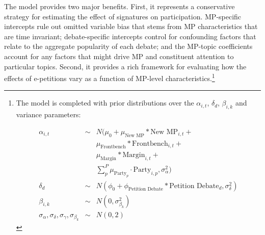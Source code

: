 \documentclass[12pt]{article}
\begin{document}
The model provides two major benefits. First, it represents a conservative strategy for estimating the effect of signatures on participation. MP-specific intercepts rule out omitted variable bias that stems from MP characteristics that are time invariant; debate-specific intercepts control for confounding factors that relate to the aggregate popularity of each debate; and the MP-topic coefficients account for any factors that might drive MP and constituent attention to particular topics. Second, it provides a rich framework for evaluating how the effects of e-petitions vary as a function of MP-level characteristics.\footnote{The model is completed with prior distributions over the $\alpha_{i,t}$, $\delta_{d}$, $\beta_{i,k}$ and variance parameters: %

\vspace{-.25cm}
\begin{eqnarray}
\label{eq:alpha_priors}
\alpha_{i,t} &\sim& N(\mu_{0} + \mu_{\text{New MP}} * \text{New MP}_{i,t} + \nonumber \\ 
&& \mu_{\text{Frontbench}} * \text{Frontbench}_{i,t} + \nonumber \\ 
&& \mu_{\text{Margin}}*\text{Margin}_{i,t} + \nonumber \\ 
&& \sum_p^P\mu_{\text{Party}_p} \cdot \text{Party}_{i,p},\sigma_\alpha^2)\\  \nonumber
\delta_d &\sim& N(\phi_{0} + \phi_{\text{Petition Debate}} * \text{Petition Debate}_d,\sigma_\delta^2)\\ \nonumber
\beta_{i,k} &\sim& N(0, \sigma_{\beta_k}^2) \\ \nonumber
\sigma_\alpha,\sigma_\delta,\sigma_\gamma,\sigma_{\beta_{k}} &\sim& N(0, 2)
\end{eqnarray} 
\vspace{-.5cm}
}
\end{document}
